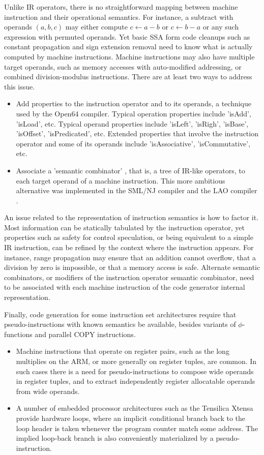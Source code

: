 Unlike IR operators, there is no straightforward mapping between machine
instruction and their operational semantics. For instance, a subtract
with operands $(a,b,c)$ may either compute $c \leftarrow a-b$ or $c
\leftarrow b-a$ or any such expression with permuted operands. Yet basic SSA
form code cleanups such as constant propagation and sign extension removal need
to know what is actually computed by machine instructions.  Machine instructions
may also have multiple target operands, such as memory accesses with
auto-modified addressing, or combined division-modulus instructions.
There are at least two ways to address this issue. \begin{itemize}
\item Add properties to the instruction operator and to its operands, a
technique used by the Open64 compiler. Typical operation properties include
'isAdd', 'isLoad', etc. Typical operand properties include 'isLeft', 'isRigh',
'isBase', 'isOffset', 'isPredicated', etc. Extended properties that involve the
instruction operator and some of its operands include 'isAssociative',
'isCommutative', etc.
\item Associate a 'semantic combinator' \cite{Leung:1999:PLDI}, that is, a tree
of IR-like operators, to each target operand of a machine instruction. This more
ambitious alternative was implemented in the SML/NJ \cite{Leung:1999:PLDI}
compiler and the LAO compiler \cite{Dinechin:2000:CASES}.  \end{itemize}

An issue related to the representation of instruction semantics is how to factor
it. Most information can be statically tabulated by the instruction operator, yet
properties such as safety for control speculation, or being equivalent to a
simple IR instruction, can be refined by the context where the instruction
appears. For instance, range propagation may ensure that an addition cannot
overflow, that a division by zero is impossible, or that a memory access is safe.
Alternate semantic combinators, or modifiers of the instruction operator semantic
combinator, need to be associated with each machine instruction of the code
generator internal representation.

Finally, code generation for some instruction set architectures require that
pseudo-instructions with known semantics be available, besides variants of
$\phi$-functions and parallel COPY instructions. \begin{itemize}
\item Machine instructions that
operate on register pairs, such as the long multiplies on the ARM, or more
generally on register tuples, are common. In such cases there is a need for
pseudo-instructions to compose wide operands in register tuples, and to extract
independently register allocatable operands from wide operands.
\item A number of embedded processor architectures such as the Tensilica Xtensa
provide hardware loops, where an implicit conditional branch back to the loop
header is taken whenever the program counter match some address. The implied
loop-back branch is also conveniently materialized by a pseudo-instruction.
\end{itemize}

